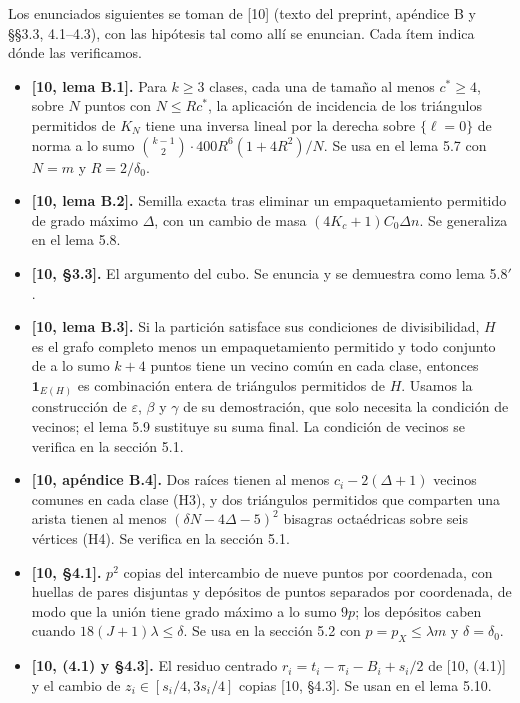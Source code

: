\documentclass[spanish,11pt,a4paper]{article}
\providecommand{\tightlist}{\setlength{\itemsep}{0pt}\setlength{\parskip}{0pt}}
\begin{document}
Los enunciados siguientes se toman de {[}10{]} (texto del preprint, apéndice B y §§3.3, 4.1--4.3), con las hipótesis tal como allí se enuncian. Cada ítem indica dónde las verificamos.

\begin{itemize}
\tightlist
\item
  \textbf{{[}10, lema B.1{]}.} Para \(k\ge3\) clases, cada una de tamaño al menos \(c^*\ge4\), sobre \(N\) puntos con \(N\le Rc^*\), la aplicación de incidencia de los triángulos permitidos de \(K_N\) tiene una inversa lineal por la derecha sobre \(\{\ell=0\}\) de norma a lo sumo \(\binom{k-1}{2}\cdot400R^6(1+4R^2)/N\). Se usa en el lema 5.7 con \(N=m\) y \(R=2/\delta_0\).
\item
  \textbf{{[}10, lema B.2{]}.} Semilla exacta tras eliminar un empaquetamiento permitido de grado máximo \(\Delta\), con un cambio de masa \((4K_c+1)C_0\Delta n\). Se generaliza en el lema 5.8.
\item
  \textbf{{[}10, §3.3{]}.} El argumento del cubo. Se enuncia y se demuestra como lema 5.8\('\).
\item
  \textbf{{[}10, lema B.3{]}.} Si la partición satisface sus condiciones de divisibilidad, \(H\) es el grafo completo menos un empaquetamiento permitido y todo conjunto de a lo sumo \(k+4\) puntos tiene un vecino común en cada clase, entonces \(\mathbf 1_{E(H)}\) es combinación entera de triángulos permitidos de \(H\). Usamos la construcción de \(\varepsilon\), \(\beta\) y \(\gamma\) de su demostración, que solo necesita la condición de vecinos; el lema 5.9 sustituye su suma final. La condición de vecinos se verifica en la sección 5.1.
\item
  \textbf{{[}10, apéndice B.4{]}.} Dos raíces tienen al menos \(c_i-2(\Delta+1)\) vecinos comunes en cada clase (H3), y dos triángulos permitidos que comparten una arista tienen al menos \((\delta N-4\Delta-5)^2\) bisagras octaédricas sobre seis vértices (H4). Se verifica en la sección 5.1.
\item
  \textbf{{[}10, §4.1{]}.} \(p^2\) copias del intercambio de nueve puntos por coordenada, con huellas de pares disjuntas y depósitos de puntos separados por coordenada, de modo que la unión tiene grado máximo a lo sumo \(9p\); los depósitos caben cuando \(18(J+1)\lambda\le\delta\). Se usa en la sección 5.2 con \(p=p_X\le\lambda m\) y \(\delta=\delta_0\).
\item
  \textbf{{[}10, (4.1) y §4.3{]}.} El residuo centrado \(r_i=t_i-\pi_i-B_i+s_i/2\) de {[}10, (4.1){]} y el cambio de \(z_i\in[s_i/4,3s_i/4]\) copias {[}10, §4.3{]}. Se usan en el lema 5.10.
\end{itemize}
\end{document}
